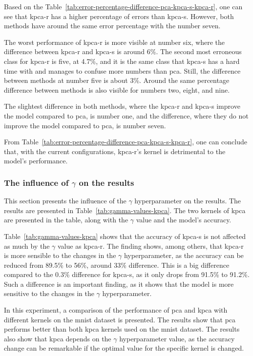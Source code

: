 Based on the Table~\ref{tab:error-percentage-difference-pca-kpca-s-kpca-r}, one can see that \gls{kpca-r} has a higher percentage of errors than \gls{kpca-s}. However, both methods have around the same error percentage with the number seven.

The worst performance of \gls{kpca-r} is more visible at number six, where the difference between \gls{kpca-r} and \gls{kpca-s} is around 6\%. The second most erroneous class for \gls{kpca-r} is five, at 4.7\%, and it is the same class that \gls{kpca-s} has a hard time with and manages to confuse more numbers than \gls{pca}. Still, the difference between methods at number five is about 3\%. Around the same percentage difference between methods is also visible for numbers two, eight, and nine.

The slightest difference in both methods, where the \gls{kpca-r} and \gls{kpca-s} improve the model compared to \gls{pca}, is number one, and the difference, where they do not improve the model compared to \gls{pca}, is number seven.

From Table~\ref{tab:error-percentage-difference-pca-kpca-s-kpca-r}, one can conclude that, with the current configurations, \gls{kpca-r}'s kernel is detrimental to the model's performance.

\subsubsection{The influence of $\gamma$ on the results}\label{subsubsec:gamma-influence}
This section presents the influence of the $\gamma$ hyperparameter on the results. The results are presented in Table~\ref{tab:gamma-values-kpca}. The two kernels of \gls{kpca} are presented in the table, along with the $\gamma$ value and the model's accuracy.



Table~\ref{tab:gamma-values-kpca} shows that the accuracy of \gls{kpca-s} is not affected as much by the $\gamma$ value as \gls{kpca-r}. The finding shows, among others, that \gls{kpca-r} is more sensible to the changes in the $\gamma$ hyperparameter, as the accuracy can be reduced from 89.5\% to 56\%, around 33\% difference. This is a big difference compared to the 0.3\% difference for \gls{kpca-s}, as it only drops from 91.5\% to 91.2\%. Such a difference is an important finding, as it shows that the model is more sensitive to the changes in the $\gamma$ hyperparameter.

In this experiment, a comparison of the performance of \gls{pca} and \gls{kpca} with different kernels on the \gls{mnist} dataset is presented. The results show that \gls{pca} performs better than both \gls{kpca} kernels used on the \gls{mnist} dataset. The results also show that \gls{kpca} depends on the $\gamma$ hyperparameter value, as the accuracy change can be remarkable if the optimal value for the specific kernel is changed.